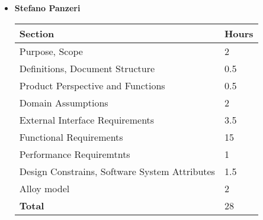 \begin{itemize}
\item \textbf{Stefano Panzeri}

\begin{table}[!h]
\centering
\begin{tabular}{|l|l|}
\hline
 \textbf{Section}														&		\textbf{Hours}  \\ \hline
Purpose, Scope														& 2 	\\ \hline
Definitions, Document Structure							& 0.5 	\\ \hline
Product Perspective and Functions						& 0.5 	\\ \hline
Domain Assumptions												&  2	\\ \hline
External Interface Requirements							& 3.5 	\\ \hline
Functional Requirements										& 15 	\\ \hline
Performance Requiremtnts									&  1	\\ \hline
Design Constrains, Software System Attributes	&  1.5	\\ \hline
Alloy model   &   2    \\ \hline
\textbf{Total}															& 28 	\\ \hline
\end{tabular}
\end{table}


\end{itemize}
